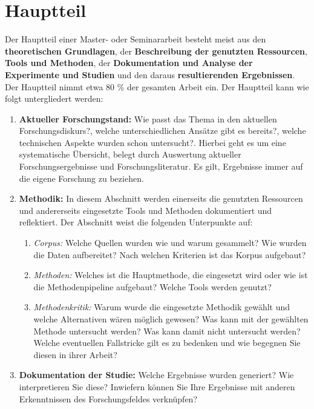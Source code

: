 \section{Hauptteil}
Der Hauptteil einer Master- oder Seminararbeit besteht meist aus den \textbf{theoretischen Grundlagen}, der \textbf{Beschreibung der genutzten Ressourcen}, \textbf{Tools und Methoden}, der \textbf{Dokumentation und Analyse der Experimente und Studien} und den daraus \textbf{resultierenden Ergebnissen}. Der Hauptteil nimmt etwa 80 \% der gesamten Arbeit ein. Der Hauptteil kann wie folgt untergliedert werden:
\begin{enumerate}
    \item \textbf{Aktueller Forschungstand:} Wie passt das Thema in den aktuellen Forschungsdiskurs?, welche unterschiedlichen Ansätze gibt es bereits?, welche technischen Aspekte wurden schon untersucht?. Hierbei geht es um eine systematische Übersicht, belegt durch Auswertung aktueller Forschungsergebnisse und Forschungsliteratur. Es gilt, Ergebnisse immer auf die eigene Forschung zu beziehen.
    \item \textbf{Methodik:} In diesem Abschnitt werden einerseits die genutzten Ressourcen und andererseits eingesetzte Tools und Methoden dokumentiert und reflektiert. Der Abschnitt weist die folgenden Unterpunkte auf:
    \begin{enumerate}
        \item \textit{Corpus:} Welche Quellen wurden wie und warum gesammelt? Wie wurden die Daten aufbereitet? Nach welchen Kriterien ist das Korpus aufgebaut?
        \item \textit{Methoden:} Welches ist die Hauptmethode, die eingesetzt wird oder wie ist die Methodenpipeline aufgebaut? Welche Tools werden genutzt? 
        \item \textit{Methodenkritik:} Warum wurde die eingesetzte Methodik gewählt und welche Alternativen wären möglich gewesen? Was kann mit der gewählten Methode untersucht werden? Was kann damit nicht untersucht werden? Welche eventuellen Fallstricke gilt es zu bedenken und wie begegnen Sie diesen in ihrer Arbeit? 
    \end{enumerate}
    \item \textbf{Dokumentation der Studie:} Welche Ergebnisse wurden generiert? Wie interpretieren Sie diese? Inwiefern können Sie Ihre Ergebnisse mit anderen Erkenntnissen des Forschungsfeldes verknüpfen?
    
\end{enumerate}